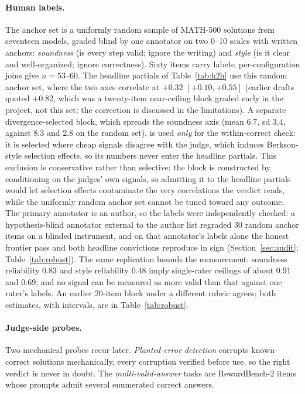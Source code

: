 \paragraph{Human labels.}
The anchor set is a uniformly random sample of \textsc{MATH-500} solutions from seventeen models, graded blind by one annotator on two 0--10 scales with written anchors: \emph{soundness} (is every step valid; ignore the writing) and \emph{style} (is it clear and well-organized; ignore correctness).
Sixty items carry labels; per-configuration joins give $n = 53$--$60$.
The headline partials of Table~\ref{tab:h2h} use this random anchor set, where the two axes correlate at $+0.32$ $[+0.10, +0.55]$ (earlier drafts quoted $+0.82$, which was a twenty-item near-ceiling block graded early in the project, not this set; the correction is discussed in the limitations).
A separate divergence-selected block, which spreads the soundness axis (mean $6.7$, sd $3.4$, against $8.3$ and $2.8$ on the random set), is used \emph{only} for the within-correct check: it is selected where cheap signals disagree with the judge, which induces Berkson-style selection effects, so its numbers never enter the headline partials.
This exclusion is conservative rather than selective: the block is constructed by conditioning on the judges' own signals, so admitting it to the headline partials would let selection effects contaminate the very correlations the verdict reads, while the uniformly random anchor set cannot be tuned toward any outcome.
The primary annotator is an author, so the labels were independently checked: a hypothesis-blind annotator external to the author list regraded 30 random anchor items on a blinded instrument, and on that annotator's labels alone the honest frontier pass and both headline convictions reproduce in sign (Section~\ref{sec:audit}; Table~\ref{tab:robust}).
The same replication bounds the measurement: soundness reliability $0.83$ and style reliability $0.48$ imply single-rater ceilings of about $0.91$ and $0.69$, and no signal can be measured as more valid than that against one rater's labels.
An earlier 20-item block under a different rubric agrees; both estimates, with intervals, are in Table~\ref{tab:robust}.

\paragraph{Judge-side probes.}
Two mechanical probes recur later.
\emph{Planted-error detection} corrupts known-correct solutions mechanically, every corruption verified before use, so the right verdict is never in doubt.
The \emph{multi-valid-answer} tasks are RewardBench-2 items whose prompts admit several enumerated correct answers.

